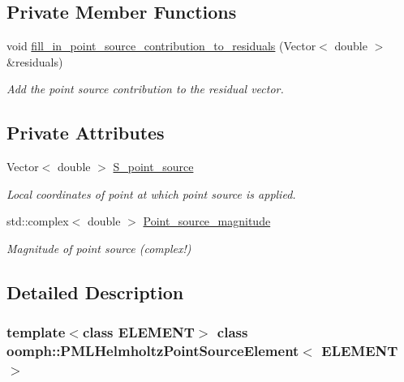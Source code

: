 \subsection*{Private Member Functions}
\begin{DoxyCompactItemize}
\item 
void \hyperlink{classoomph_1_1PMLHelmholtzPointSourceElement_a3c9a152c82821bc163e0764125efd6d6}{fill\+\_\+in\+\_\+point\+\_\+source\+\_\+contribution\+\_\+to\+\_\+residuals} (Vector$<$ double $>$ \&residuals)
\begin{DoxyCompactList}\small\item\em Add the point source contribution to the residual vector. \end{DoxyCompactList}\end{DoxyCompactItemize}
\subsection*{Private Attributes}
\begin{DoxyCompactItemize}
\item 
Vector$<$ double $>$ \hyperlink{classoomph_1_1PMLHelmholtzPointSourceElement_afd6460c2714c0e00a078ab015cc8eb15}{S\+\_\+point\+\_\+source}
\begin{DoxyCompactList}\small\item\em Local coordinates of point at which point source is applied. \end{DoxyCompactList}\item 
std\+::complex$<$ double $>$ \hyperlink{classoomph_1_1PMLHelmholtzPointSourceElement_a64e3e8f4e30588c06ac79e69f1d02eb2}{Point\+\_\+source\+\_\+magnitude}
\begin{DoxyCompactList}\small\item\em Magnitude of point source (complex!) \end{DoxyCompactList}\end{DoxyCompactItemize}


\subsection{Detailed Description}
\subsubsection*{template$<$class E\+L\+E\+M\+E\+NT$>$\newline
class oomph\+::\+P\+M\+L\+Helmholtz\+Point\+Source\+Element$<$ E\+L\+E\+M\+E\+N\+T $>$}

